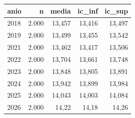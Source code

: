 \begin{tabular}{lrrrr}
\toprule
anio & n & media & ic\_inf & ic\_sup \\
\midrule
2018 & 2.000 & 13,457 & 13,416 & 13,497 \\
2019 & 2.000 & 13,499 & 13,455 & 13,542 \\
2021 & 2.000 & 13,462 & 13,417 & 13,506 \\
2022 & 2.000 & 13,704 & 13,661 & 13,748 \\
2023 & 2.000 & 13,848 & 13,805 & 13,891 \\
2024 & 2.000 & 13,942 & 13,899 & 13,984 \\
2025 & 2.000 & 14,043 & 14,003 & 14,084 \\
2026 & 2.000 & 14,22 & 14,18 & 14,26 \\
\bottomrule
\end{tabular}
